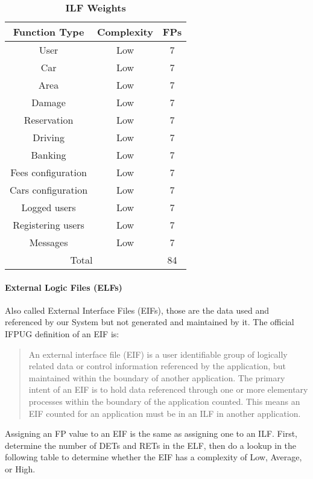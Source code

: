 \begin{longtable}{| c | c | c |}
	\caption{\textbf{ILF Weights}} %
	\label{tab:ilf_weights}%
	\\ \hline %
	
	\textbf{Function Type} & \textbf{Complexity} & \textbf{FPs}\\ \hline
	User & Low & 7\\ \hline
	Car & Low & 7\\ \hline
	Area & Low & 7\\ \hline
	Damage & Low & 7\\ \hline
	Reservation & Low & 7\\ \hline
	Driving & Low & 7\\ \hline
	Banking & Low & 7\\ \hline
	Fees configuration & Low & 7\\ \hline
	Cars configuration & Low & 7\\ \hline
	Logged users & Low & 7\\ \hline
	Registering users & Low & 7 \\ \hline
	Messages & Low & 7 \\ \hline
	\multicolumn{2}{|c|}{Total} & 84 \\ \hline
	
\end{longtable}

\paragraph{External Logic Files (ELFs)}
Also called External Interface Files (EIFs), those are the data used and referenced by our System but not generated and maintained by it.
The official IFPUG definition of an EIF is:

\begin{quote}
An external interface file (EIF) is a user identifiable group of logically related data or control information referenced by the application, but maintained within the boundary of another application. The primary intent of an EIF is to hold data referenced through one or more elementary processes within the boundary of the application counted. This means an EIF counted for an application must be in an ILF in another application.
\end{quote}

Assigning an FP value to an EIF is the same as assigning one to an ILF. First, determine the number of DETs and RETs in the ELF, then do a lookup in the following table to determine whether the EIF has a complexity of Low, Average, or High.  



